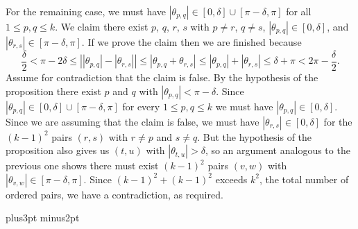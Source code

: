 \documentclass[12pt]{article}
\def\blackslug{\hbox{\kern1pt\vrule height6pt width4pt  depth1pt\kern1pt}}
\def\qed{\penalty 500\hbox{\quad\blackslug}\ifmmode\else\par
                                             \vskip4.5pt plus3pt minus2pt\fi}
\begin{document}
For the remaining case, we must have 
$|\theta_{p,q}|\in[0,\delta]\cup[\pi-\delta,\pi]$ 
for all $1\le p,q \le k$.  We claim there exist $p$, $q$, $r$, $s$ with
$p\ne r$, $q\ne s$, $|\theta_{p,q}|\in[0,\delta]$, and $|\theta_{r,s}|\in[\pi-\delta,\pi]$. If we prove the claim then we are finished because
\[
\frac{\delta}{2} < \pi-2\delta 
\le \left||\theta_{p,q}|-|\theta_{r,s}|\right| 
\le |\theta_{p,q}+\theta_{r,s}| 
\le |\theta_{p,q}|+|\theta_{r,s}| 
\le \delta+\pi < 2\pi-\frac{\delta}{2}.
\]
Assume for contradiction that the claim is false. By the hypothesis of the
proposition there exist $p$ and $q$ with $|\theta_{p,q}|<\pi-\delta$. Since
$|\theta_{p,q}|\in[0,\delta]\cup[\pi-\delta,\pi]$ for every $1\le p,q\le k$
we must have $|\theta_{p,q}|\in[0,\delta]$. Since we are assuming that the
claim is false, we must have $|\theta_{r,s}|\in[0,\delta]$ for the
$(k-1)^2$ pairs $(r,s)$ with $r\ne p$ and $s\ne q$. But the hypothesis of
the proposition also gives us $(t,u)$ with $|\theta_{t,u}|>\delta$, so an
argument analogous to the previous one shows there must exist $(k-1)^2$ pairs $(v,w)$ with
$|\theta_{v,w}|\in[\pi-\delta,\pi]$. Since $(k-1)^2+(k-1)^2$ exceeds $k^2$, the
total number of ordered pairs, we have a contradiction, as required.
\qed


\end{document}

